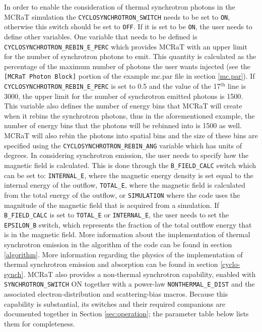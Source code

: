 \documentclass[12pt,a4paper]{article}
\begin{document}
In order to enable the consideration of thermal synchrotron photons in the MCRaT simulation the \texttt{CYCLOSYNCHROTRON\_SWITCH} needs to be set to \texttt{ON}, otherwise this switch should be set to \texttt{OFF}. If it is set to be \texttt{ON}, the user needs to define other variables. One variable that needs to be defined is \texttt{CYCLOSYNCHROTRON\_REBIN\_E\_PERC} which provides MCRaT with an upper limit for the number of synchrotron photons to emit. This quantity is calculated as the percentage of the maximum number of photons the user wants injected (see the \texttt{[MCRaT Photon Block]} portion of the example mc.par file in section \ref{mc.par}). If \texttt{CYCLOSYNCHROTRON\_REBIN\_E\_PERC} is set to 0.5 and the value of the 17$^\textrm{th}$ line is 3000, the upper limit for the number of synchrotron emitted photons is 1500. This variable also defines the number of energy bins that MCRaT will create when it rebins the synchrotron photons, thus in the aforementioned example, the number of energy bins that the photons will be rebinned into is 1500 as well. MCRaT will also rebin the photons into spatial bins and the size of these bins are specified using the \texttt{CYCLOSYNCHROTRON\_REBIN\_ANG} variable which has units of degrees. In considering synchrotron emission, the user needs to specify how the magnetic field is calculated. This is done through the \texttt{B\_FIELD\_CALC} switch which can be set to: \texttt{INTERNAL\_E}, where the magnetic energy density is set equal to the internal energy of the outflow, \texttt{TOTAL\_E}, where the magnetic field is calculated from the total energy of the outflow, or \texttt{SIMULATION} where the code uses the magnitude of the magnetic field that is acquired from a simulation. If \texttt{B\_FIELD\_CALC} is set to \texttt{TOTAL\_E} or \texttt{INTERNAL\_E}, the user needs to set the \texttt{EPSILON\_B} switch, which represents the fraction of the total outflow energy that is in the magnetic field. More information about the implementation of thermal synchrotron emission in the algorithm of the code can be found in section \ref{algorithm}. More information regarding the physics of the implementation of thermal synchrotron emission and absorption can be found in section \ref{cyclo-synch}. MCRaT also provides a non-thermal synchrotron capability, enabled with \texttt{SYNCHROTRON\_SWITCH} ON together with a power-law \texttt{NONTHERMAL\_E\_DIST} and the associated electron-distribution and scattering-bias macros. Because this capability is substantial, its switches and their required companions are documented together in Section \ref{sec:operation}; the parameter table below lists them for completeness.
\end{document}

